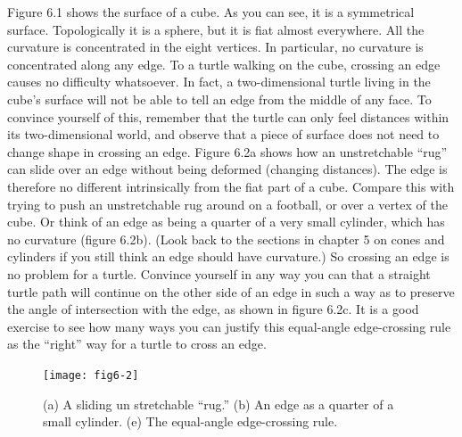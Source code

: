 \documentclass{book}
\begin{document}
Figure 6.1 shows the surface of a cube. As you can see, it is a
symmetrical surface. Topologically it is a sphere, but it is fiat almost
everywhere. All the curvature is concentrated in the eight vertices. In
particular, no curvature is concentrated along any edge. To a turtle
walking on the cube, crossing an edge causes no difficulty whatsoever.
In fact, a two-dimensional turtle living in the cube's surface will not be
able to tell an edge from the middle of any face. To convince yourself
of this, remember that the turtle can only feel distances within its
two-dimensional world, and observe that a piece of surface does not
need to change shape in crossing an edge. Figure 6.2a shows how an
unstretchable ``rug'' can slide over an edge without being deformed
(changing distances). The edge is therefore no different intrinsically
from the fiat part of a cube. Compare this with trying to push an
unstretchable rug around on a football, or over a vertex of the cube. Or
think of an edge as being a quarter of a very small cylinder, which has
no curvature (figure 6.2b). (Look back to the sections in chapter 5 on
cones and cylinders if you still think an edge should have curvature.)
So crossing an edge is no problem for a turtle. Convince yourself in
any way you can that a straight turtle path will continue on the other
side of an edge in such a way as to preserve the angle of intersection with
the edge, as shown in figure 6.2c. It is a good exercise to see how many
ways you can justify this equal-angle edge-crossing rule as the ``right''
way for a turtle to cross an edge.

\begin{figure}
\begin{center}
\texttt{[image: fig6-2]}
\caption{(a) A sliding un stretchable ``rug.'' (b) An edge as a quarter of a small cylinder. (e) The equal-angle edge-crossing rule.}
\end{center}
\end{figure}
\end{document}
